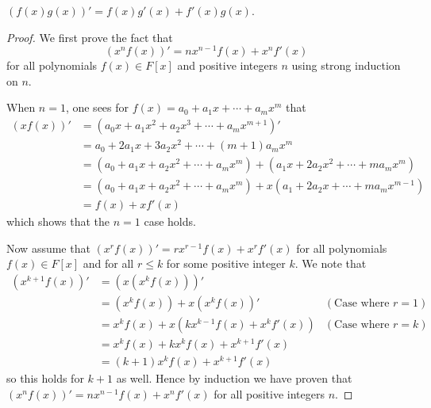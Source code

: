 \begin{proposition}
    $(f(x)g(x))' = f(x)g'(x) + f'(x)g(x)$.
\end{proposition}
\begin{proof}
    We first prove the fact that
    \[
        (x^nf(x))' = nx^{n-1}f(x) + x^nf'(x)
    \]
    for all polynomials $f(x) \in F[x]$ and positive integers $n$ using strong induction on $n$.

    When $n = 1$, one sees for $f(x) = a_0 + a_1x + \cdots + a_mx^m$ that
    \begin{align*}
        (xf(x))' &= \left(a_0x + a_1x^2 + a_2x^3 + \cdots + a_mx^{m+1}\right)'\\
        &= a_0 + 2a_1x + 3a_2x^2 + \cdots + (m+1)a_mx^m\\
        &= \left(a_0 + a_1x + a_2x^2 + \cdots + a_mx^m\right) + \left(a_1x + 2a_2x^2 + \cdots + ma_mx^m\right)\\
        &= \left(a_0 + a_1x + a_2x^2 + \cdots + a_mx^m\right) + x\left(a_1 + 2a_2x + \cdots + ma_mx^{m-1}\right)\\
        &= f(x) + xf'(x)
    \end{align*}
    which shows that the $n = 1$ case holds.

    Now assume that $(x^rf(x))' = rx^{r-1}f(x) + x^rf'(x)$ for all polynomials $f(x) \in F[x]$ and for all $r \leq k$ for some positive integer $k$. We note that
    \begin{align*}
        (x^{k+1}f(x))' &= \left(x\left(x^kf(x)\right)\right)'\\
        &= \left(x^kf(x)\right) + x\left(x^kf(x)\right)' & (\text{Case where }r=1)\\
        &= x^kf(x) + x\left(kx^{k-1}f(x) + x^kf'(x)\right) & (\text{Case where }r=k)\\
        &= x^kf(x) + kx^kf(x) + x^{k+1}f'(x)\\
        &= (k+1)x^kf(x) + x^{k+1}f'(x)
    \end{align*}
    so this holds for $k + 1$ as well. Hence by induction we have proven that $(x^nf(x))' = nx^{n-1}f(x) + x^nf'(x)$ for all positive integers $n$.


\end{proof}
